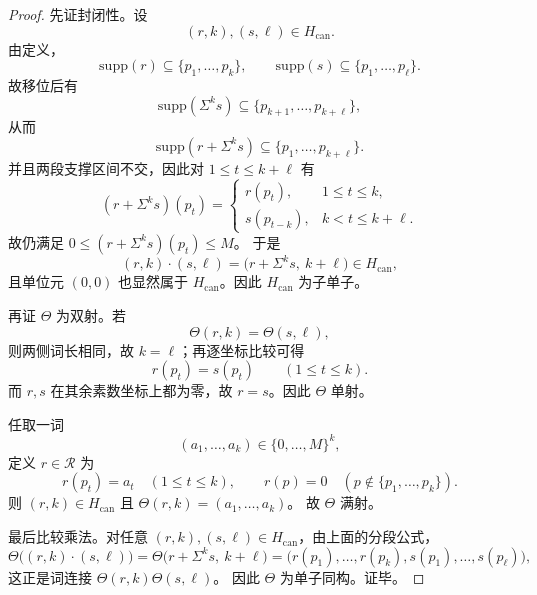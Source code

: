 \begin{proof}
先证封闭性。设
\[
(r,k),(s,\ell)\in H_{\mathrm{can}}.
\]
由定义，
\[
\mathrm{supp}(r)\subseteq\{p_1,\dots,p_k\},
\qquad
\mathrm{supp}(s)\subseteq\{p_1,\dots,p_{\ell}\}.
\]
故移位后有
\[
\mathrm{supp}(\Sigma^k s)\subseteq\{p_{k+1},\dots,p_{k+\ell}\},
\]
从而
\[
\mathrm{supp}(r+\Sigma^k s)\subseteq\{p_1,\dots,p_{k+\ell}\}.
\]
并且两段支撑区间不交，因此对 \(1\le t\le k+\ell\) 有
\[
(r+\Sigma^k s)(p_t)=
\begin{cases}
r(p_t),& 1\le t\le k,\\[2pt]
s(p_{t-k}),& k<t\le k+\ell.
\end{cases}
\]
故仍满足
\(
0\le (r+\Sigma^k s)(p_t)\le M
\)。
于是
\[
(r,k)\cdot (s,\ell)=\bigl(r+\Sigma^k s,\ k+\ell\bigr)\in H_{\mathrm{can}},
\]
且单位元 \((0,0)\) 也显然属于 \(H_{\mathrm{can}}\)。因此 \(H_{\mathrm{can}}\) 为子单子。

再证 \(\Theta\) 为双射。若
\[
\Theta(r,k)=\Theta(s,\ell),
\]
则两侧词长相同，故 \(k=\ell\)；再逐坐标比较可得
\[
r(p_t)=s(p_t)\qquad (1\le t\le k).
\]
而 \(r,s\) 在其余素数坐标上都为零，故 \(r=s\)。因此 \(\Theta\) 单射。

任取一词
\[
(a_1,\dots,a_k)\in\{0,\dots,M\}^{k},
\]
定义 \(r\in\mathcal R\) 为
\[
r(p_t)=a_t\quad(1\le t\le k),
\qquad
r(p)=0\quad(p\notin\{p_1,\dots,p_k\}).
\]
则 \((r,k)\in H_{\mathrm{can}}\) 且
\(
\Theta(r,k)=(a_1,\dots,a_k)
\)。
故 \(\Theta\) 满射。

最后比较乘法。对任意 \((r,k),(s,\ell)\in H_{\mathrm{can}}\)，由上面的分段公式，
\[
\Theta\bigl((r,k)\cdot(s,\ell)\bigr)
=
\Theta\bigl(r+\Sigma^k s,\ k+\ell\bigr)
=
\bigl(r(p_1),\dots,r(p_k),s(p_1),\dots,s(p_{\ell})\bigr),
\]
这正是词连接
\(
\Theta(r,k)\Theta(s,\ell)
\)。
因此 \(\Theta\) 为单子同构。证毕。
\end{proof}


